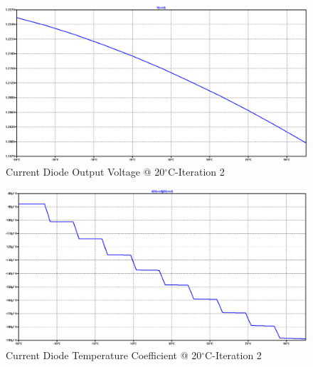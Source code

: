 \documentclass[conference]{IEEEtran}
\begin{document}
\begin{figure}[!htbp]
  	\centering
  	\includegraphics[scale=0.35]{images/appendix/cd2-vref.png}
  	\caption[output-z-meas]{Current Diode Output Voltage @ 20$^{\circ}$C-Iteration 2}
  	\label{fig:cd2-vref}
	\end{figure}
\begin{figure}[!htbp]
  	\centering
  	\includegraphics[scale=0.35]{images/appendix/cd2-tempco.png}
  	\caption[output-z-meas]{Current Diode Temperature Coefficient @ 20$^{\circ}$C-Iteration 2}
  	\label{fig:cd2-tempco}
	\end{figure}
\end{document}
